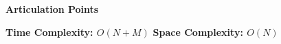\textbf{Articulation Points}

\textbf{Time Complexity: $O(N + M)$}
\textbf{Space Complexity: $O(N)$}

